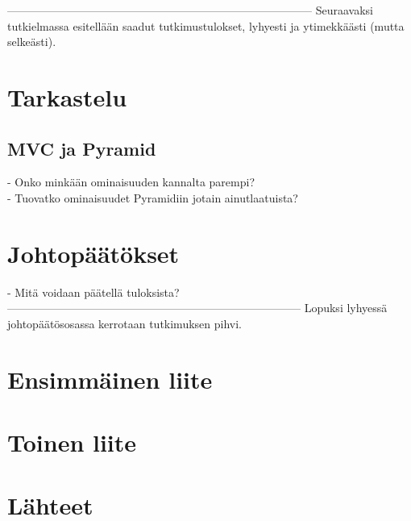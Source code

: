 \documentclass[finnish,utf8,nonumbib,palatino,kandi]{gradu2}
\begin{document}
---------------------------------------------------------------------------------
Seuraavaksi tutkielmassa esitellään saadut tutkimustulokset, lyhyesti
ja ytimekkäästi (mutta selkeästi).

\section{Tarkastelu}
\subsection{MVC ja Pyramid}
- Onko minkään ominaisuuden kannalta parempi? \\
- Tuovatko ominaisuudet Pyramidiin jotain ainutlaatuista?

\section{Johtopäätökset}
- Mitä voidaan päätellä tuloksista?
------------------------------------------------------------------------------
Lopuksi lyhyessä johtopäätösosassa kerrotaan tutkimuksen pihvi.




\appendix
\section{Ensimmäinen liite}
\section{Toinen liite}


\section{Lähteet}
\end{document}
